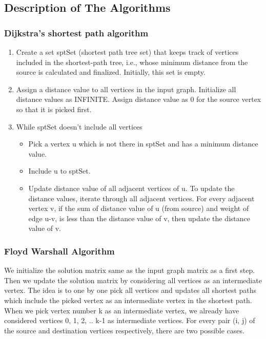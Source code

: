 \documentclass[a4paper, 12pt]{article}
\begin{document}
\subsection{Description of The Algorithms}

\subsubsection*{Dijkstra’s shortest path algorithm}

\begin{enumerate}
      \item Create a set sptSet (shortest path tree set) that keeps track of vertices included in the shortest-path tree, i.e., whose minimum distance from the source is calculated and finalized. Initially, this set is empty.
      \item  Assign a distance value to all vertices in the input graph. Initialize all distance values as INFINITE. Assign distance value as 0 for the source vertex so that it is picked first.
      \item While sptSet doesn’t include all vertices
            \begin{itemize}
                  \item Pick a vertex u which is not there in sptSet and has a minimum distance value.
                  \item Include u to sptSet.
                  \item Update distance value of all adjacent vertices of u. To update the distance values, iterate through all adjacent vertices. For every adjacent vertex v, if the sum of distance value of u (from source) and weight of edge u-v, is less than the distance value of v, then update the distance value of v.
            \end{itemize}
\end{enumerate}

\subsubsection*{Floyd Warshall Algorithm}

We initialize the solution matrix same as the input graph matrix as a first step. Then we update the solution matrix by considering all vertices as an intermediate vertex. The idea is to one by one pick all vertices and updates all shortest paths which include the picked vertex as an intermediate vertex in the shortest path. When we pick vertex number k as an intermediate vertex, we already have considered vertices {0, 1, 2, .. k-1} as intermediate vertices. For every pair (i, j) of the source and destination vertices respectively, there are two possible cases.
\end{document}
